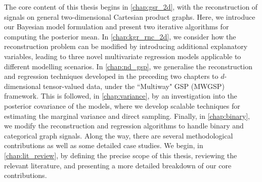 The core content of this thesis begins in \cref{chap:gsr_2d}, with the reconstruction of signals on general two-dimensional Cartesian product graphs. Here, we introduce our Bayesian model formulation and present two iterative algorithms for computing the posterior mean. In \cref{chap:kgr_rnc_2d}, we consider how the reconstruction problem can be modified by introducing additional explanatory variables, leading to three novel multivariate regression models applicable to different modelling scenarios. In \cref{chap:nd_gsp}, we generalise the reconstruction and regression techniques developed in the preceding two chapters to $d$-dimensional tensor-valued data, under the ``Multiway" GSP (MWGSP) framework. This is followed, in \cref{chap:variance}, by an investigation into the posterior covariance of the models, where we develop scalable techniques for estimating the marginal variance and direct sampling. Finally, in \cref{chap:binary}, we modify the reconstruction and regression algorithms to handle binary and categorical graph signals. Along the way, there are several methodological contributions as well as some detailed case studies. We begin, in \cref{chap:lit_review}, by defining the precise scope of this thesis, reviewing the relevant literature, and presenting a more detailed breakdown of our core contributions. 
